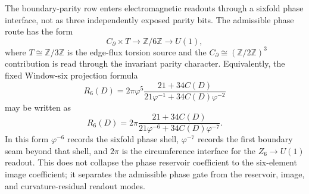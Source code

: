 \begin{principle}
\label{prin:zeckendorf-sixfold-phase-circumference-interface}
The boundary-parity row enters electromagnetic readouts through a
sixfold phase interface, not as three independently exposed parity bits.
The admissible phase route has the form
$$
  C_\partial\times T
  \longrightarrow
  \mathbb{Z}/6\mathbb{Z}
  \longrightarrow
  U(1),
$$
where \(T\cong\mathbb{Z}/3\mathbb{Z}\) is the edge-flux torsion source
and the \(C_\partial\cong(\mathbb{Z}/2\mathbb{Z})^3\) contribution is
read through the invariant parity character. Equivalently, the fixed
Window-six projection formula
$$
  R_6(D)
  =
  2\pi\varphi^5
  \frac{21+34C(D)}{21\varphi^{-1}+34C(D)\varphi^{-2}}
$$
may be written as
$$
  R_6(D)
  =
  2\pi
  \frac{21+34C(D)}{21\varphi^{-6}+34C(D)\varphi^{-7}}.
$$
In this form \(\varphi^{-6}\) records the sixfold phase shell,
\(\varphi^{-7}\) records the first boundary seam beyond that shell, and
\(2\pi\) is the circumference interface for the \(Z_6\to U(1)\) readout.
This does not collapse the phase reservoir coefficient to the six-element
image coefficient; it separates the admissible phase gate from the
reservoir, image, and curvature-residual readout modes.
\end{principle}







